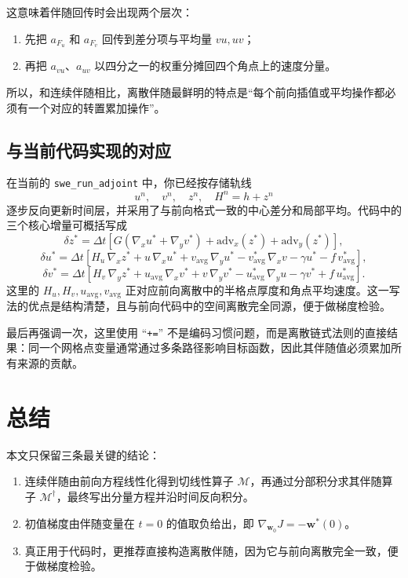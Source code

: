 \documentclass[12pt,a4paper,twoside]{article}
\begin{document}
这意味着伴随回传时会出现两个层次：
\begin{enumerate}
    \item 先把 $a_{F_u}$ 和 $a_{F_v}$ 回传到差分项与平均量 $vu, uv$；
    \item 再把 $a_{vu}$、$a_{uv}$ 以四分之一的权重分摊回四个角点上的速度分量。
\end{enumerate}
所以，和连续伴随相比，离散伴随最鲜明的特点是“每个前向插值或平均操作都必须有一个对应的转置累加操作”。

\subsection*{与当前代码实现的对应}

在当前的 \texttt{swe\_run\_adjoint} 中，你已经按存储轨线
\[
u^n,\quad v^n,\quad z^n,\quad H^n=h+z^n
\]
逐步反向更新时间层，并采用了与前向格式一致的中心差分和局部平均。代码中的三个核心增量可概括写成
\[
\delta z^* = \Delta t \left[
G\left(\nabla_x u^* + \nabla_y v^*\right)
+ \text{adv}_x(z^*)
+ \text{adv}_y(z^*)
\right],
\]
\[
\delta u^* = \Delta t \left[
H_{u}\,\nabla_x z^*
+ u\,\nabla_x u^*
+ v_{\mathrm{avg}}\,\nabla_y u^*
- v_{\mathrm{avg}}^*\,\nabla_x v
- \gamma u^*
- f\,v_{\mathrm{avg}}^*
\right],
\]
\[
\delta v^* = \Delta t \left[
H_{v}\,\nabla_y z^*
+ u_{\mathrm{avg}}\,\nabla_x v^*
+ v\,\nabla_y v^*
- u_{\mathrm{avg}}^*\,\nabla_y u
- \gamma v^*
+ f\,u_{\mathrm{avg}}^*
\right].
\]
这里的 $H_u, H_v, u_{\mathrm{avg}}, v_{\mathrm{avg}}$ 正对应前向离散中的半格点厚度和角点平均速度。这一写法的优点是结构清楚，且与前向代码中的空间离散完全同源，便于做梯度检验。

最后再强调一次，这里使用 ``\texttt{+=}'' 不是编码习惯问题，而是离散链式法则的直接结果：同一个网格点变量通常通过多条路径影响目标函数，因此其伴随值必须累加所有来源的贡献。

\section{总结}

本文只保留三条最关键的结论：
\begin{enumerate}
    \item 连续伴随由前向方程线性化得到切线性算子 $\mathcal{M}$，再通过分部积分求其伴随算子 $\mathcal{M}^\dagger$，最终写出分量方程并沿时间反向积分。
    \item 初值梯度由伴随变量在 $t=0$ 的值取负给出，即 $\nabla_{\mathbf{w}_0}J = -\mathbf{w}^*(0)$。
    \item 真正用于代码时，更推荐直接构造离散伴随，因为它与前向离散完全一致，便于做梯度检验。
\end{enumerate}
\end{document}
